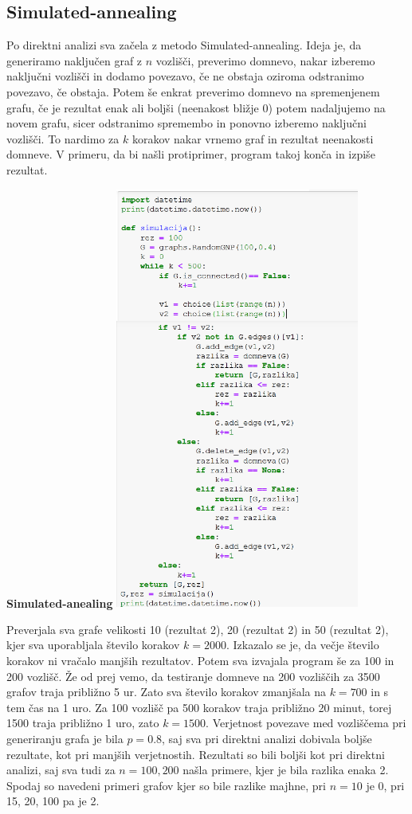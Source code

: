 \documentclass[10pt, a4paper]{article}
\begin{document}
\subsection{Simulated-annealing}
Po direktni analizi sva začela z metodo Simulated-annealing. Ideja je, da generiramo naključen graf z $n$ vozlišči, preverimo domnevo, nakar izberemo naključni vozlišči in dodamo povezavo, če ne obstaja oziroma odstranimo povezavo, če obstaja. Potem še enkrat preverimo domnevo na spremenjenem grafu, če je rezultat enak ali boljši (neenakost bližje 0) potem nadaljujemo na novem grafu, sicer odstranimo spremembo in ponovno izberemo naključni vozlišči. To nardimo za $k$ korakov nakar vrnemo graf in rezultat neenakosti domneve. V primeru, da bi našli protiprimer, program takoj konča in izpiše rezultat.

\begin{center}
\textbf{Simulated-anealing}
\includegraphics[width=8cm]{Simulacija}
\end{center}

Preverjala sva grafe velikosti 10 (rezultat 2), 20 (rezultat 2) in 50 (rezultat 2), kjer sva uporabljala število korakov $k=2000$. Izkazalo se je, da večje število korakov ni vračalo manjših rezultatov. Potem sva izvajala program še za 100 in 200 vozlišč. Že od prej vemo, da testiranje domneve na 200 vozliščih za 3500 grafov traja približno 5 ur. Zato sva število korakov zmanjšala na $k=700$ in s tem čas na 1 uro. Za 100 vozlišč pa 500 korakov traja približno 20 minut, torej 1500 traja približno 1 uro, zato $k=1500$. Verjetnost povezave med vozliščema pri generiranju grafa je bila $p=0.8$, saj sva pri direktni analizi dobivala boljše rezultate, kot pri manjših verjetnostih. Rezultati so bili boljši kot pri direktni analizi, saj sva tudi za $n=100,200$ našla primere, kjer je bila razlika enaka 2. Spodaj so navedeni primeri grafov kjer so bile razlike majhne, pri $n=10$ je 0, pri 15, 20, 100 pa je 2.
\end{document}
